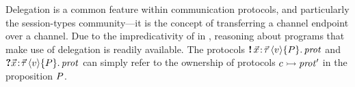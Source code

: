 \newcommand{\delegationfig}{
\begin{figure}[t!]
\begin{equation*}
\begin{array}{@{}l@{\quad}l@{}}
\begin{array}[t]{@{}l@{}}
\listsortdelservicename\ \cmpvar\ \chan\ \eqdef \\
  \quad \mbranchE
     \chan
     {\begin{array}[t]{@{}l@{}}
      \Let \chan' = \start{\listsortservicename\ \cmpvar} in \\
      \send \chan {\chan'}; \\
      \listsortdelservicename\ \cmpvar\ \chan
      \end{array}}
     \TT
\end{array}
&
\begin{array}[t]{@{}l@{}}
  \listsortdelclientname\ \cmpvar\ l = \\
  \quad \Let \chan = \start{\listsortdelservicename\ \cmpvar} in \\
  \quad \Let k = \defemph{new\_list}\ \TT in \\
  \quad \begin{array}{@{}l @{} l @{}}
      \defemph{iter}\ (\Lam l'.{} & \select \chan \leftname; \\
      & \Let \chan' = \recv \chan in \\
      & \defemph{push}\ c'\ k;\ \send {\chan'} {l'})\ l
      \end{array} \\
  \quad \send \chan \rightname; \\
  \quad \defemph{iter}\ \langkw{recv}\ k\\
\end{array}
\end{array}
\end{equation*}
\caption{A recursive version of the sort service that uses delegation to perform
multiple jobs in parallel (the code for the function $\defemph{push}$,
which pushes an element to the head of a list, has been elided).}
\label{fig:delegation}
\end{figure}
}

Delegation is a common feature within communication protocols, and
particularly the session-types community---it is the concept of transferring
a channel endpoint over a channel.
Due to the impredicativity of \pname in \lname, reasoning about programs
that make use of delegation is readily available.
The protocols $\sendprot {\xdots} \val \iprop \prot$ and
$\recvprot {\xdots} \val \iprop \prot$ can simply refer to the ownership of
protocols $c \rightarrowtail \mathit{prot}'$ in the proposition $P$.

